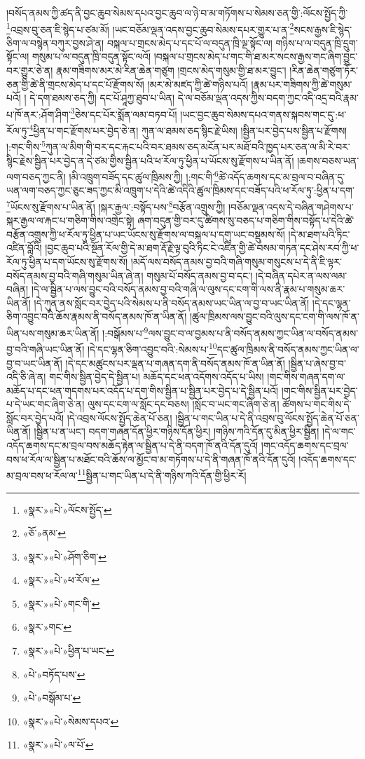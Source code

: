 །བསོད་ནམས་ཀྱི་ཚད་ནི་བྱང་ཆུབ་སེམས་དཔའ་བྱང་ཆུབ་ལ་ཉེ་བ་མ་གཏོགས་པ་སེམས་ཅན་གྱི་:ལོངས་སྤྱོད་ཀྱི་\footnote{«སྣར་»«པེ་»ལོངས་སྤྱོད་}འབྲས་བུ་ཅན་ཇི་སྙེད་པ་ཙམ་མོ། །ཡང་བཅོམ་ལྡན་འདས་བྱང་ཆུབ་སེམས་དཔར་གྱུར་པ་ན་\footnote{«ཅོ་»ནམ་}སངས་རྒྱས་ཇི་སྙེད་ཅིག་ལ་བསྙེན་བཀུར་བྱས་ཤེ་ན། བསྐལ་པ་གྲངས་མེད་པ་དང་པོ་ལ་བདུན་ཁྲི་ལྔ་སྟོང་ལ། གཉིས་པ་ལ་བདུན་ཁྲི་དྲུག་སྟོང་ལ། གསུམ་པ་ལ་བདུན་ཁྲི་བདུན་སྟོང་ལའོ། །བསྐལ་པ་གྲངས་མེད་པ་གང་གི་ཐ་མར་སངས་རྒྱས་གང་ཞིག་བྱུང་བར་གྱུར་ཅེ་ན། རྣམ་གཟིགས་མར་མེ་རིན་ཆེན་གཙུག །གྲངས་མེད་གསུམ་གྱི་ཐ་མར་བྱུང་། །རིན་ཆེན་གཙུག་ཏོར་ཅན་གྱི་ཚེ་ནི་གྲངས་མེད་པ་དང་པོ་རྫོགས་སོ། །མར་མེ་མཛད་ཀྱི་ཚེ་གཉིས་པའོ། །རྣམ་པར་གཟིགས་ཀྱི་ཚེ་གསུམ་པའོ། །
དེ་དག་ཐམས་ཅད་ཀྱི། དང་པོ་ཤཱཀྱ་ཐུབ་པ་ཡིན། དེ་ལ་བཅོམ་ལྡན་འདས་ཀྱིས་བདག་ཀྱང་འདི་འདྲ་བའི་རྣམ་པ་ཁོ་ནར་:ཤོག་ཤིག་\footnote{«སྣར་»«པེ་»ཤོག་ཅིག་}ཅེས་དང་པོར་སྨོན་ལམ་བཏབ་པོ། །ཡང་བྱང་ཆུབ་སེམས་དཔའ་གནས་སྐབས་གང་དུ་:ཕ་རོལ་ཏུ་\footnote{«སྣར་»«པེ་»ཕ་རོལ་}ཕྱིན་པ་གང་རྫོགས་པར་བྱེད་ཅེ་ན། ཀུན་ལ་ཐམས་ཅད་སྙིང་རྗེ་ཡིས། །སྦྱིན་པར་བྱེད་པས་སྦྱིན་པ་རྫོགས། །:གང་གིས་\footnote{«སྣར་»«པེ་»གང་གི་}ཀུན་ལ་མིག་གི་བར་དང་རྐང་པའི་བར་ཐམས་ཅད་མངོན་པར་མཐོ་བའི་ཁྱད་པར་ཅན་ལ་མི་རེ་བར་སྙིང་རྗེས་སྦྱིན་པར་བྱེད་ན་དེ་ཙམ་གྱིས་སྦྱིན་པའི་ཕ་རོལ་ཏུ་ཕྱིན་པ་ཡོངས་སུ་རྫོགས་པ་ཡིན་ནོ། །ཆགས་བཅས་ཡན་ལག་བཅད་ཀྱང་ནི། །མི་འཁྲུག་བཟོད་དང་ཚུལ་ཁྲིམས་ཀྱི། །:གང་གི་\footnote{«སྣར་»གང་}ཚེ་འདོད་ཆགས་དང་མ་བྲལ་བ་བཞིན་དུ་ཡན་ལག་བཅད་ཀྱང་ཅུང་ཟད་ཀྱང་མི་འཁྲུག་པ་དེའི་ཚེ་འདིའི་ཚུལ་ཁྲིམས་དང་བཟོད་པའི་ཕ་རོལ་ཏུ་:ཕྱིན་པ་དག་\footnote{«སྣར་»«པེ་»ཕྱིན་པ་ཡང་}ཡོངས་སུ་རྫོགས་པ་ཡིན་ནོ། །སྐར་རྒྱལ་:བསྟོད་པས་\footnote{«པེ་»བཏོད་པས་}བརྩོན་འགྲུས་ཀྱི། །བཅོམ་ལྡན་འདས་དེ་བཞིན་གཤེགས་པ་སྐར་རྒྱལ་ལ་རྐང་པ་གཅིག་གིས་འགྲེང་སྟེ། ཞག་བདུན་གྱི་བར་དུ་ཚིགས་སུ་བཅད་པ་གཅིག་གིས་བསྟོད་པ་དེའི་ཚེ་བརྩོན་འགྲུས་ཀྱི་ཕ་རོལ་ཏུ་ཕྱིན་པ་ཡང་ཡོངས་སུ་རྫོགས་ལ་བསྐལ་པ་དགུ་ཡང་བསྡུམས་སོ། །དེ་མ་ཐག་པའི་ཏིང་འཛིན་བློའི། །བྱང་ཆུབ་པའི་སྔོན་རོལ་གྱི་དེ་མ་ཐག་རྡོ་རྗེ་ལྟ་བུའི་ཏིང་ངེ་འཛིན་གྱི་ཚེ་བསམ་གཏན་དང་ཤེས་རབ་ཀྱི་ཕ་རོལ་ཏུ་ཕྱིན་པ་དག་ཡོངས་སུ་རྫོགས་སོ། །མདོ་ལས་བསོད་ནམས་བྱ་བའི་གཞི་གསུམ་གསུངས་པ་དེ་ནི་ཇི་ལྟར་བསོད་ནམས་བྱ་བའི་གཞི་གསུམ་ཡིན་ཞེ་ན། གསུམ་པོ་བསོད་ནམས་བྱ་བ་དང་། །དེ་བཞིན་དཔེར་ན་ལས་ལམ་བཞིན། །དེ་ལ་སྦྱིན་པ་ལས་བྱུང་བའི་བསོད་ནམས་བྱ་བའི་གཞི་ལ་ལུས་དང་ངག་གི་ལས་ནི་རྣམ་པ་གསུམ་ཆར་ཡིན་ནོ། །དེ་ཀུན་ནས་སློང་བར་བྱེད་པའི་སེམས་པ་ནི་བསོད་ནམས་ཡང་ཡིན་ལ་བྱ་བ་ཡང་ཡིན་ནོ། །དེ་དང་ལྷན་ཅིག་འབྱུང་བའི་ཆོས་རྣམས་ནི་བསོད་ནམས་ཁོ་ན་ཡིན་ནོ། །ཚུལ་ཁྲིམས་ལས་བྱུང་བའི་ལུས་དང་ངག་གི་ལས་ཁོ་ན་ཡིན་པས་གསུམ་ཆར་ཡིན་ནོ། །:བསྒོམས་པ་\footnote{«པེ་»བསྒོམ་པ་}ལས་བྱུང་བ་ལ་བྱམས་པ་ནི་བསོད་ནམས་ཀྱང་ཡིན་ལ་བསོད་ནམས་བྱ་བའི་གཞི་ཡང་ཡིན་ནོ། །དེ་དང་ལྷན་ཅིག་འབྱུང་བའི་:སེམས་པ་\footnote{«སྣར་»«པེ་»སེམས་དཔའ་}དང་ཚུལ་ཁྲིམས་ནི་བསོད་ནམས་ཀྱང་ཡིན་ལ་བྱ་བ་ཡང་ཡིན་ནོ། །དེ་དང་མཚུངས་པར་ལྡན་པ་གཞན་དག་ནི་བསོད་ནམས་ཁོ་ན་ཡིན་ནོ། །སྦྱིན་པ་ཞེས་བྱ་བ་འདི་ཅི་ཞེ་ན། གང་གིས་སྦྱིན་བྱེད་དེ་སྦྱིན་པ། མཆོད་དང་ཕན་འདོགས་འདོད་པ་ཡིས། །གང་གིས་གཞན་དག་ལ་མཆོད་པ་དང་ཕན་གདགས་པར་འདོད་པ་དག་གིས་སྦྱིན་པ་སྦྱིན་པར་བྱེད་པ་དེ་སྦྱིན་པའོ། །གང་གིས་སྦྱིན་པར་བྱེད་པ་དེ་ཡང་གང་ཞིག་ཅེ་ན། ལུས་དང་ངག་ལ་སློང་དང་བཅས། །སློང་བ་ཡང་གང་ཞིག་ཅེ་ན། ཚོགས་པ་གང་གིས་དེ་སློང་བར་བྱེད་པའོ། །དེ་འབྲས་ལོངས་སྤྱོད་ཆེན་པོ་ཅན། །སྦྱིན་པ་གང་ཡིན་པ་དེ་ནི་འབྲས་བུ་ལོངས་སྤྱོད་ཆེན་པོ་ཅན་ཡིན་ནོ། །སྦྱིན་པ་ན་ཡང་། བདག་གཞན་དོན་ཕྱིར་གཉིས་དོན་ཕྱིར། །གཉིས་ཀའི་དོན་དུ་མིན་ཕྱིར་སྦྱིན། །དེ་ལ་གང་འདོད་ཆགས་དང་མ་བྲལ་བས་མཆོད་རྟེན་ལ་སྦྱིན་པ་དེ་ནི་བདག་ཁོ་ནའི་དོན་དུའོ། །གང་འདོད་ཆགས་དང་བྲལ་བས་ཕ་རོལ་ལ་སྦྱིན་པ་མཐོང་བའི་ཆོས་ལ་མྱོང་བ་མ་གཏོགས་པ་དེ་ནི་གཞན་ཁོ་ནའི་དོན་དུའོ། །འདོད་ཆགས་དང་མ་བྲལ་བས་ཕ་རོལ་ལ་\footnote{«སྣར་»«པེ་»ལ་པོ་}སྦྱིན་པ་གང་ཡིན་པ་དེ་ནི་གཉིས་ཀའི་དོན་གྱི་ཕྱིར་རོ། 